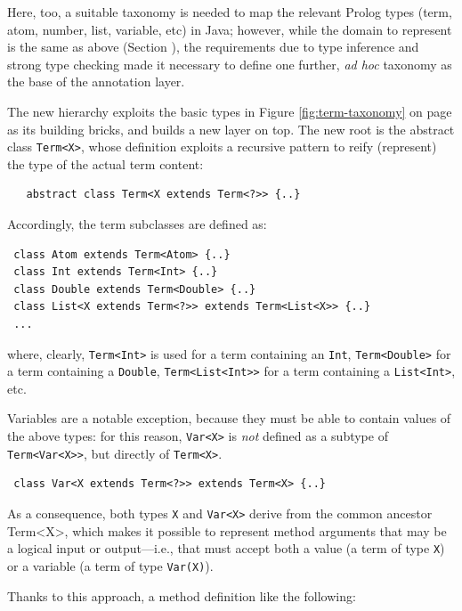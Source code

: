 Here, too, a suitable taxonomy is needed to map the relevant Prolog types (term, atom, number, list, variable, etc) in Java; however, while the domain to represent is the same as above (Section \label{ssec:java-api-types}), the requirements due to type inference and strong type checking made it necessary to define one further, \textit{ad hoc} taxonomy as the base of the annotation layer.

The new hierarchy exploits the basic types in Figure \ref{fig:term-taxonomy} on page \pageref{fig:term-taxonomy} as its building bricks, and builds a new layer on top.
The new root is the abstract class \texttt{Term<X>}, whose definition exploits a recursive pattern to reify (represent) the type of the actual term content:

\begin{verbatim}
   abstract class Term<X extends Term<?>> {..}
\end{verbatim}

\noindent Accordingly, the term subclasses are defined as:

\begin{verbatim}
 class Atom extends Term<Atom> {..}
 class Int extends Term<Int> {..}
 class Double extends Term<Double> {..}
 class List<X extends Term<?>> extends Term<List<X>> {..}
 ...
\end{verbatim}

\noindent where, clearly, \texttt{Term<Int>} is used for a term containing an \texttt{Int}, \texttt{Term<Double>} for a term containing a \texttt{Double}, \texttt{Term<List<Int>>} for a term containing a \texttt{List<Int>}, etc.

Variables are a notable exception, because they must be able to contain values of the above types: for this reason, \texttt{Var<X>} is \textit{not} defined as a subtype of \texttt{Term<Var<X>>}, but directly of \texttt{Term<X>}.

\begin{verbatim}
 class Var<X extends Term<?>> extends Term<X> {..}
\end{verbatim}

\noindent As a consequence, both types \texttt{X} and \texttt{Var<X>} derive from the common ancestor Term<X>, which makes it possible to represent method arguments that may be a logical input or output---i.e., that must accept both a value (a term of type \texttt{X}) or a variable (a term of type \texttt{Var(X)}).

Thanks to this approach, a method definition like the following:

